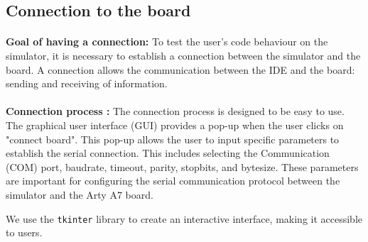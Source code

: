 \documentclass{article}
\begin{document}













\newpage
\subsection{Connection to the board}
\paragraph{}\textbf{Goal of having a connection:} To test the user's code behaviour on the simulator, it is necessary to establish a connection between the simulator and the board. A connection allows the communication between the IDE and the board: sending and receiving of information.

\paragraph{}\textbf{Connection process :} The connection process is designed to be easy to use. The graphical user interface (GUI) provides a pop-up when the user clicks on "connect board". This pop-up allows the user to input specific parameters to establish the serial connection. This includes selecting the Communication (COM) port, baudrate, timeout, parity, stopbits, and bytesize. These parameters are important for configuring the serial communication protocol between the simulator and the Arty A7 board.

We use the \texttt{tkinter} library to create an interactive interface, making it accessible to users. 
\end{document}
